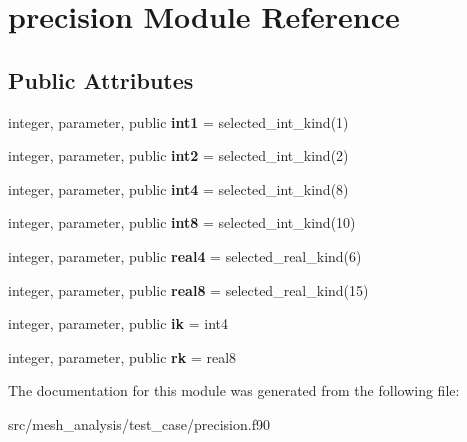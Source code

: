\hypertarget{classprecision}{\section{precision Module Reference}
\label{classprecision}
}
\subsection*{Public Attributes}
\begin{DoxyCompactItemize}
\item 
\hypertarget{classprecision_a41eeb9d0f54ddf59adcde8023f3c5641}{integer, parameter, public {\bfseries int1} = selected\-\_\-int\-\_\-kind(1)}\label{classprecision_a41eeb9d0f54ddf59adcde8023f3c5641}

\item 
\hypertarget{classprecision_ae22ef3ed47df2ba3323ae75ed53b209d}{integer, parameter, public {\bfseries int2} = selected\-\_\-int\-\_\-kind(2)}\label{classprecision_ae22ef3ed47df2ba3323ae75ed53b209d}

\item 
\hypertarget{classprecision_a62a7aa7f4fb3cb0f87bb618bf40020e8}{integer, parameter, public {\bfseries int4} = selected\-\_\-int\-\_\-kind(8)}\label{classprecision_a62a7aa7f4fb3cb0f87bb618bf40020e8}

\item 
\hypertarget{classprecision_adaa41e1c11fbdaf61a1b96b75ce14222}{integer, parameter, public {\bfseries int8} = selected\-\_\-int\-\_\-kind(10)}\label{classprecision_adaa41e1c11fbdaf61a1b96b75ce14222}

\item 
\hypertarget{classprecision_a702af613e0904ca78327a8f990d53ba5}{integer, parameter, public {\bfseries real4} = selected\-\_\-real\-\_\-kind(6)}\label{classprecision_a702af613e0904ca78327a8f990d53ba5}

\item 
\hypertarget{classprecision_ac323343e1b98342a4f436d4255fe0254}{integer, parameter, public {\bfseries real8} = selected\-\_\-real\-\_\-kind(15)}\label{classprecision_ac323343e1b98342a4f436d4255fe0254}

\item 
\hypertarget{classprecision_ae2b868cba4af495c552019404efdaa8e}{integer, parameter, public {\bfseries ik} = int4}\label{classprecision_ae2b868cba4af495c552019404efdaa8e}

\item 
\hypertarget{classprecision_a854fb654bf94c729e111f2bc014d650e}{integer, parameter, public {\bfseries rk} = real8}\label{classprecision_a854fb654bf94c729e111f2bc014d650e}

\end{DoxyCompactItemize}


The documentation for this module was generated from the following file\-:\begin{DoxyCompactItemize}
\item 
src/mesh\-\_\-analysis/test\-\_\-case/precision.\-f90\end{DoxyCompactItemize}
